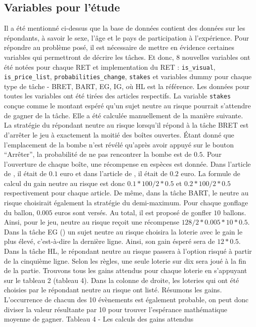 \documentclass[12pt]{article}
\begin{document}
\subsection{Variables pour l'étude}

Il a été mentionné ci-dessus que la base de données contient des données
sur les répondants, à savoir le sexe, l'âge et le pays de participation
à l'expérience. Pour répondre au problème posé, il est nécessaire de
mettre en évidence certaines variables qui permettront de décrire les
tâches. Et donc, 8 nouvelles variables ont été notées pour chaque RET et
implementation du RET : \texttt{is\_visual}, \texttt{is\_price\_list},
\texttt{probabilities\_change}, \texttt{stakes} et variables dummy pour
chaque type de tâche - BRET, BART, EG, IG, où HL est la référence. Les
données pour toutes les variables ont été tirées des articles
respectifs. La variable \texttt{stakes} conçue comme le montant espéré
qu'un sujet neutre au risque pourrait s'attendre de gagner de la tâche.
Elle a été calculée manuellement de la manière suivante. La stratégie du
répondant neutre au risque lorsqu'il répond à la tâche BRET est
d'arrêter le jeu à exactement la moitié des boîtes ouvertes. Étant donné
que l'emplacement de la bombe n'est révélé qu'après avoir appuyé sur le
bouton ``Arrêter'', la probabilité de ne pas rencontrer la bombe est de
\(0.5\). Pour l'ouverture de chaque boîte, une récompense en espèces est
donnée. Dans l'article de \citet{Crosetto2013}, il était de \(0.1\) euro
et dans l'article de \citet{Crosetto2016}, il était de \(0.2\) euro. La
formule de calcul du gain neutre au risque est donc
\(0.1 * 100 / 2 * 0.5\) et \(0.2 * 100 / 2 * 0.5\) respectivement pour
chaque article. De même, dans la tâche BART, le neutre au risque
choisirait également la stratégie du demi-maximum. Pour chaque gonflage
du ballon, \(0.005\) euros sont versés. Au total, il est proposé de
gonfler \(10\) ballons. Ainsi, pour le jeu, neutre au risque reçoit une
récompense \(128 / 2 * 0.005 * 10 * 0.5\). Dans la tâche EG
(\citet{Crosetto2016}) un sujet neutre au risque choisira la loterie
avec le gain le plus élevé, c'est-à-dire la dernière ligne. Ainsi, son
gain ésperé sera de \(12 * 0.5\). Dans la tâche HL, le répondant neutre
au risque passera à l'option risqué à partir de la cinquième ligne.
Selon les règles, une seule loterie sur dix sera joué à la fin de la
partie. Trouvons tous les gains attendus pour chaque loterie en
s'appuyant sur le tableau 2 (tableau 4). Dans la colonne de droite, les
loteries qui ont été choisies par le répondant neutre au risque ont
listé. Résumons les gains. L'occurrence de chacun des 10 évènements est
également probable, on peut donc diviser la valeur résultante par 10
pour trouver l'espérance mathématique moyenne de gagner. \newpage
Tableau 4 - Les calculs des gains attendus
\end{document}
